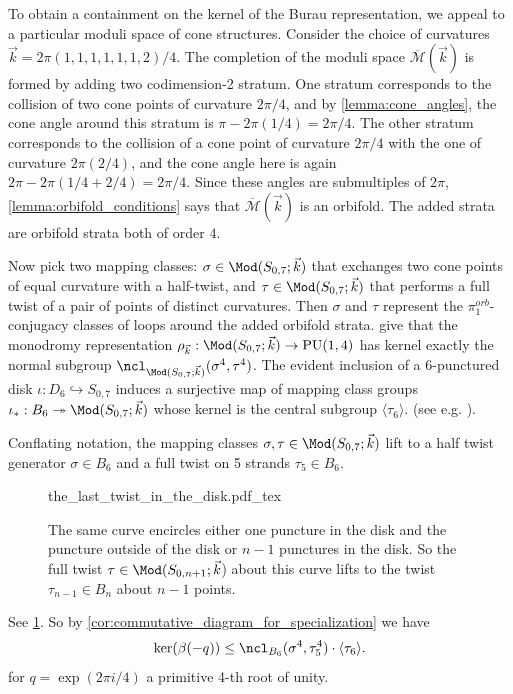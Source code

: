 \documentclass{amsart}
\begin{document}
    \begin{example}[The case of $n=6$ and $d=4$] \label{ex:Burau_6}
        To obtain a containment on the kernel of the Burau representation, we appeal to a particular moduli space of cone structures. Consider the choice of curvatures $\vec k = 2\pi(1,1,1,1,1,1,2)/4$. The completion of the moduli space $\overline{\mathcal M}(\vec k)$ is formed by adding two codimension-2 stratum. One stratum corresponds to the collision of two cone points of curvature $2\pi/4$, and by \cref{lemma:cone_angles}, the cone angle around this stratum is $\pi - 2\pi(1/4)=2\pi/4$. The other stratum corresponds to the collision of a cone point of curvature $2\pi/4$ with the one of curvature $2\pi(2/4)$, and the cone angle here is again $2\pi-2\pi(1/4+2/4)=2\pi/4$. Since these angles are submultiples of $2\pi$, \cref{lemma:orbifold_conditions} says that $\overline{\mathcal M}(\vec k)$ is an orbifold. The added strata are orbifold strata both of order $4$.
        
        Now pick two mapping classes: $\sigma \in \Mod(S_{0,7};\vec k)$ that exchanges two cone points of equal curvature with a half-twist, and $\tau \in \Mod(S_{0,7};\vec k)$ that performs a full twist of a pair of points of distinct curvatures. Then $\sigma$ and $\tau$ represent the $\pi_1^{orb}$-conjugacy classes of loops around the added orbifold strata.  give that the monodromy representation $\rho_{\vec k}:\Mod(S_{0,7};\vec k) \to \operatorname{PU}(1,4)$ has kernel exactly the normal subgroup $\ncl_{\Mod(S_{0,7};\vec k)}(\sigma^4,\tau^4)$. The evident inclusion of a 6-punctured disk $\iota:D_6 \hookrightarrow S_{0,7}$ induces a surjective map of mapping class groups $\iota_*:B_6 \twoheadrightarrow \Mod(S_{0,7};\vec k)$ whose kernel is the central subgroup $\langle \tau_6 \rangle$. (see e.g. \cite[Proposition 3.19]{Farb2012AGroups}).
        
        Conflating notation, the mapping classes $\sigma,\tau \in \Mod(S_{0,7};\vec k)$ lift to a half twist generator $\sigma \in B_6$ and a full twist on 5 strands $\tau_5 \in B_6$.
        \begin{figure}
            \centering
                \def\svgwidth{0.25\columnwidth}
                {the_last_twist_in_the_disk.pdf_tex}
                \caption{The same curve encircles either one puncture in the disk and the puncture outside of the disk or $n-1$ punctures in the disk. So the full twist $\tau \in \Mod(S_{0,n+1};\vec k$) about this curve lifts to the twist $\tau_{n-1} \in B_n$ about $n-1$ points.}
                \label{fig:the_last_twist_in_the_disk}
        \end{figure}
        See \cref{fig:the_last_twist_in_the_disk}. So by \cref{cor:commutative_diagram_for_specialization} we have
        \begin{equation}
            \ker (\beta(-q)) \leq \ncl_{B_6}(\sigma^4,\tau_5^4) \cdot \langle \tau_6 \rangle. \label{eqn:burau_6_containment}
        \end{equation}
        for $q=\exp(2\pi i/4)$ a primitive 4-th root of unity.


\end{example}
\end{document}
